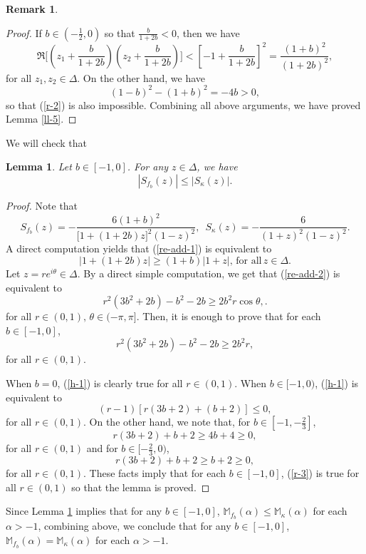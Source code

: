 \documentclass[10pt]{amsart}
\newtheorem{lemma}[theorem]{Lemma}
\theoremstyle{definition}    %
\newtheorem{remark}[theorem]{Remark}
\numberwithin{equation}{section}
\begin{document}
\begin{remark}
\begin{proof}
If $b\in (-\frac{1}{2},0)$ so that $\frac{b}{1+2b}<0$, then we have  
$$\Re{\Big[(z_1+\frac{b}{1+2b})(z_2+\frac{b}{1+2b})\Big]}<[-1+\frac{b}{1+2b}]^2=\frac{(1+b)^2}{(1+2b)^2},$$
for all $z_1,z_2 \in\Delta$. On the other hand, we have
$$(1-b)^2-(1+b)^2=-4b>0,$$
so that (\ref{r-2}) is also impossible. Combining all above arguments, we have proved Lemma \ref{ll-5}.  
 \end{proof}
We will check that 
\begin{lemma}\label{lemma-l}Let $b\in [-1, 0]$. For any $z\in \Delta$, we have
\begin{equation}\label{re-add-1}|S_{f_b}(z)|\leq |S_{\kappa}(z)|.\end{equation}
\end{lemma}
\begin{proof}
Note that
$$
S_{f_b}(z)=-\frac{6(1+b)^2}{\bigl[1+(1+2b)z\bigr]^2(1-z)^2}, \,\,\,
S_{\kappa}(z)=-\frac{6}{(1+z)^2(1-z)^2}.
$$ 
A direct computation yields that (\ref{re-add-1}) is equivalent to 
\begin{equation}\label{re-add-2}
|1+(1+2b)z|\geq (1+b)|1+z|, \,\text{for all}\,z\in \Delta. 
\end{equation}
Let $z=re^{i\theta}\in \Delta$. By a direct simple computation, we get that (\ref{re-add-2}) is equivalent to 
\begin{equation} 
r^2(3b^2+2b)-b^2-2b\geq 2b^2r\cos\theta,. \nonumber
\end{equation}for all $r\in (0,1), \, \theta\in (-\pi, \pi].$ Then, it is enough to prove that for each $b\in [-1,0]$,
\begin{equation}\label{h-1} 
r^2(3b^2+2b)-b^2-2b\geq 2b^2r,
\end{equation}for all $r\in (0,1).$ 

When $b=0$, (\ref{h-1}) is clearly true for all $r\in (0,1)$. When $b\in [-1,0)$, (\ref{h-1}) is equivalent to 
\begin{equation}\label{r-3} (r-1)[r(3b+2)+(b+2)]\leq 0, \end{equation}
for all $r\in (0,1)$. On the other hand, we note that, for $b\in [-1, -\frac{2}{3}]$, $$r(3b+2)+b+2\geq 4b+4 \geq 0,$$
for all $r\in (0,1)$ and for $b\in [-\frac{2}{3},0)$, $$r(3b+2)+b+2\geq b+2 \geq 0,$$
for all $r\in (0,1)$. These facts imply that for each $b\in [-1,0]$, (\ref{r-3}) is true for all $r\in (0,1)$ so that the lemma is proved. 
\end{proof}
Since Lemma \ref{lemma-l} implies that for any $b\in [-1,0]$, $\mathbb{M}_{f_b}(\alpha)\leq \mathbb{M}_{\kappa}(\alpha)$ for each $\alpha>-1$, combining above, we conclude that for any $b\in [-1,0]$, $\mathbb{M}_{f_b}(\alpha)=\mathbb{M}_{\kappa}(\alpha)$ for each $\alpha>-1$. 
\end{remark}
\end{document}
